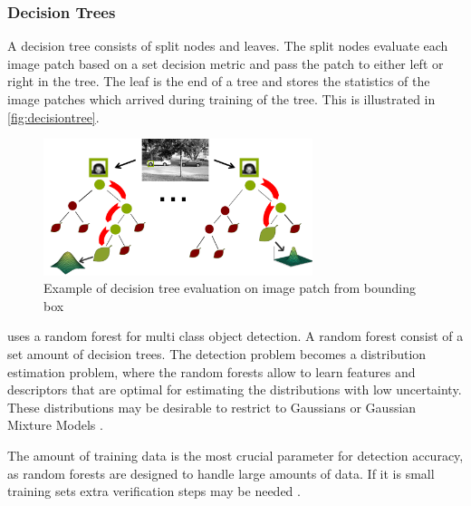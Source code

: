 \subsubsection{Decision Trees}
A decision tree consists of split nodes and leaves. The split nodes evaluate each image patch based on a set decision metric and pass the patch to either left or right in the tree. The leaf is the end of a tree and stores the statistics of the image patches which arrived during training of the tree. This is illustrated in \autoref{fig:decisiontree}.

\begin{figure}[H]
  \centering
  \includegraphics[width=0.7\textwidth]{figures/decisiontree}
  \caption{Example of decision tree evaluation on image patch from bounding box \citep{Gall2012}}
  \label{fig:decisiontree}
\end{figure}

\cite{Gall2012} uses a random forest for multi class object detection. A random forest consist of a set amount of decision trees.
The detection problem becomes a distribution estimation problem, where the random forests allow to learn features and descriptors that are optimal for estimating the distributions with low uncertainty. These distributions may be desirable to restrict to Gaussians or Gaussian Mixture Models \citep{Gall2012}.

The amount of training data is the most crucial parameter for detection accuracy, as random forests are designed to handle large amounts of data. If it is small training sets extra verification steps may be needed \citep{Gall2012}.

